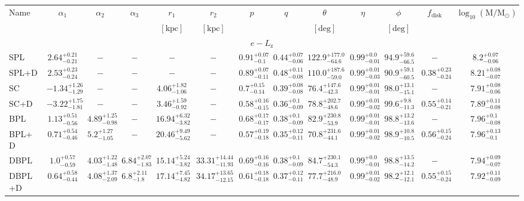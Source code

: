 \begin{table*}
{\begin{tabular}{lcccccccccccc}
\hline 
Name & $\alpha_{1}$ & $\alpha_{2}$ & $\alpha_{3}$ & $r_{1}$ & $r_{2}$ & $p$ & $q$ & $\theta$ & $\eta$ & $\phi$ & $f_\mathrm{disk}$ & $\log_{10}(\mathrm{M}/\mathrm{M_{\odot}})$ \\ 
 &  &  &  & $[\mathrm{kpc}]$ & $[\mathrm{kpc}]$ &  &  & $[\mathrm{deg}]$ &  & $[\mathrm{deg}]$ &  &  \\ 
\hline 
\multicolumn{13}{c}{$e-L_\mathrm{z}$} \\ 
\hline 
SPL & $2.64^{+0.21}_{-0.21}$ & $-$ & $-$ & $-$ & $-$ & $0.91^{+0.07}_{-0.1}$ & $0.44^{+0.07}_{-0.06}$ & $122.9^{+177.0}_{-64.6}$ & $0.99^{+0.0}_{-0.01}$ & $94.9^{+59.6}_{-66.5}$ & $-$ & $8.2^{+0.07}_{-0.06}$ \\ 
SPL+D & $2.53^{+0.23}_{-0.24}$ & $-$ & $-$ & $-$ & $-$ & $0.89^{+0.07}_{-0.11}$ & $0.48^{+0.11}_{-0.08}$ & $110.0^{+187.6}_{-59.0}$ & $0.99^{+0.01}_{-0.03}$ & $90.9^{+59.1}_{-60.5}$ & $0.38^{+0.23}_{-0.24}$ & $8.21^{+0.08}_{-0.07}$ \\ 
SC & $-1.34^{+1.26}_{-1.29}$ & $-$ & $-$ & $4.06^{+1.82}_{-1.06}$ & $-$ & $0.7^{+0.15}_{-0.14}$ & $0.39^{+0.08}_{-0.08}$ & $76.4^{+147.6}_{-42.3}$ & $0.99^{+0.01}_{-0.01}$ & $98.0^{+13.1}_{-15.1}$ & $-$ & $7.91^{+0.08}_{-0.06}$ \\ 
\rowcolor{lightgray} SC+D & $-3.22^{+1.75}_{-1.81}$ & $-$ & $-$ & $3.46^{+1.59}_{-0.92}$ & $-$ & $0.58^{+0.16}_{-0.15}$ & $0.36^{+0.1}_{-0.09}$ & $78.8^{+202.7}_{-48.6}$ & $0.99^{+0.01}_{-0.02}$ & $99.6^{+9.8}_{-11.3}$ & $0.55^{+0.14}_{-0.21}$ & $7.89^{+0.11}_{-0.08}$ \\ 
BPL & $1.13^{+0.51}_{-0.56}$ & $4.89^{+1.25}_{-0.98}$ & $-$ & $16.94^{+6.32}_{-3.82}$ & $-$ & $0.68^{+0.17}_{-0.17}$ & $0.38^{+0.1}_{-0.09}$ & $82.9^{+230.8}_{-53.9}$ & $0.99^{+0.01}_{-0.01}$ & $98.8^{+13.2}_{-13.6}$ & $-$ & $7.96^{+0.1}_{-0.08}$ \\ 
BPL+D & $0.71^{+0.54}_{-0.46}$ & $5.2^{+1.27}_{-1.05}$ & $-$ & $20.46^{+9.49}_{-5.62}$ & $-$ & $0.57^{+0.19}_{-0.18}$ & $0.35^{+0.12}_{-0.11}$ & $70.8^{+231.6}_{-44.1}$ & $0.99^{+0.01}_{-0.02}$ & $98.9^{+10.8}_{-10.5}$ & $0.56^{+0.15}_{-0.24}$ & $7.96^{+0.13}_{-0.1}$ \\ 
DBPL & $1.0^{+0.57}_{-0.59}$ & $4.03^{+1.22}_{-1.48}$ & $6.84^{+2.07}_{-1.83}$ & $15.14^{+5.24}_{-3.82}$ & $33.31^{+14.44}_{-11.93}$ & $0.69^{+0.16}_{-0.16}$ & $0.38^{+0.1}_{-0.09}$ & $84.7^{+230.1}_{-54.3}$ & $0.99^{+0.0}_{-0.01}$ & $98.8^{+13.5}_{-14.2}$ & $-$ & $7.94^{+0.09}_{-0.07}$ \\ 
DBPL+D & $0.64^{+0.58}_{-0.44}$ & $4.08^{+1.37}_{-2.09}$ & $6.8^{+2.11}_{-1.8}$ & $17.14^{+7.45}_{-4.82}$ & $34.17^{+13.65}_{-12.15}$ & $0.61^{+0.18}_{-0.18}$ & $0.37^{+0.12}_{-0.11}$ & $77.7^{+216.0}_{-48.9}$ & $0.99^{+0.01}_{-0.02}$ & $98.2^{+12.1}_{-12.1}$ & $0.55^{+0.15}_{-0.24}$ & $7.92^{+0.11}_{-0.09}$ \\ 

\end{tabular}}
\end{table*}
